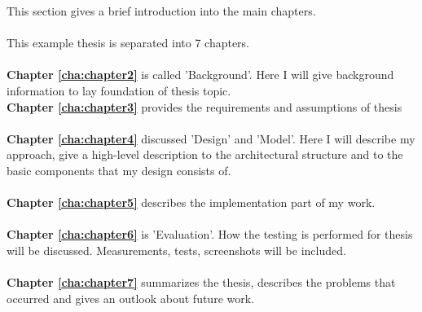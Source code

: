 This section gives a brief introduction into the main chapters. 
\\
\\
\noindent This example thesis is separated into 7 chapters.
\\
\\
\textbf{Chapter \ref{cha:chapter2}} is called 'Background'. Here I will give background information to lay foundation of thesis topic.
\\
\textbf{Chapter \ref{cha:chapter3}} provides the requirements and assumptions of thesis
\\
\\
\textbf{Chapter \ref{cha:chapter4}} discussed  'Design' and 'Model'. Here I will describe my approach, give a high-level description to the architectural structure and to the basic components that my design consists of.
\\
\\
\textbf{Chapter \ref{cha:chapter5}} describes the implementation part of my work.
\\
\\
\textbf{Chapter \ref{cha:chapter6}} is 'Evaluation'. How the testing is performed for thesis will be discussed. Measurements, tests, screenshots will be included.
\\
\\
\textbf{Chapter \ref{cha:chapter7}} summarizes the thesis, describes the problems that occurred and gives an outlook about future work.
